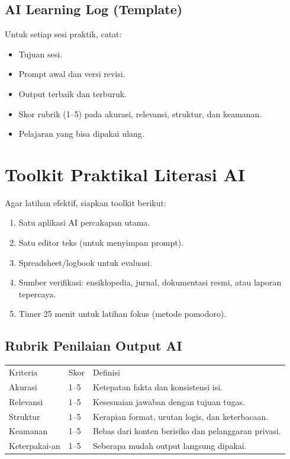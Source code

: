 \documentclass[12pt,oneside]{book}
\begin{document}
\section*{AI Learning Log (Template)}
Untuk setiap sesi praktik, catat:
\begin{itemize}[leftmargin=*]
\item Tujuan sesi.
\item Prompt awal dan versi revisi.
\item Output terbaik dan terburuk.
\item Skor rubrik (1--5) pada akurasi, relevansi, struktur, dan keamanan.
\item Pelajaran yang bisa dipakai ulang.
\end{itemize}
\clearpage

\chapter{Toolkit Praktikal Literasi AI}
Agar latihan efektif, siapkan toolkit berikut:
\begin{enumerate}[leftmargin=*]
\item Satu aplikasi AI percakapan utama.
\item Satu editor teks (untuk menyimpan prompt).
\item Spreadsheet/logbook untuk evaluasi.
\item Sumber verifikasi: ensiklopedia, jurnal, dokumentasi resmi, atau laporan tepercaya.
\item Timer 25 menit untuk latihan fokus (metode pomodoro).
\end{enumerate}

\section*{Rubrik Penilaian Output AI}
\begin{longtable}{p{}p{}p{}}
Kriteria & Skor & Definisi\\
Akurasi & 1--5 & Ketepatan fakta dan konsistensi isi.\\
Relevansi & 1--5 & Kesesuaian jawaban dengan tujuan tugas.\\
Struktur & 1--5 & Kerapian format, urutan logis, dan keterbacaan.\\
Keamanan & 1--5 & Bebas dari konten berisiko dan pelanggaran privasi.\\
Keterpakai-an & 1--5 & Seberapa mudah output langsung dipakai.\\
\end{longtable}
\clearpage
\end{document}
